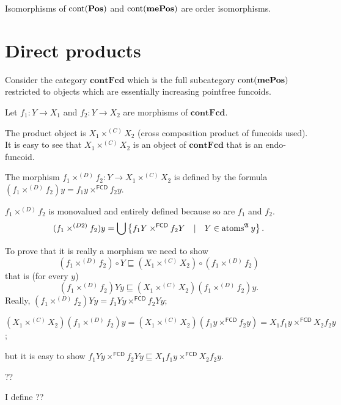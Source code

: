 \begin{obvious}
Isomorphisms of $\operatorname{cont} (\mathbf{Pos})$ and
$\operatorname{cont} (\mathbf{mePos})$ are order
isomorphisms.
\end{obvious}

\section{Direct products}


Consider the category $\mathbf{contFcd}$ which is the full
subcategory $\operatorname{cont} (\mathbf{mePos})$ restricted to
objects which are essentially increasing pointfree funcoids.

Let $f_1 : Y \rightarrow X_1$ and $f_2 : Y \rightarrow X_2$ are morphisms of
$\mathbf{contFcd}$.

The product object is $X_1 \times^{(C)} X_2$ (cross composition product of
funcoids used). It is easy to see that $X_1 \times^{(C)} X_2$ is an object of
$\mathbf{contFcd}$ that is an endo-funcoid.

The morphism $f_1 \times^{(D)} f_2 : Y \rightarrow X_1 \times^{(C)} X_2$ is
defined by the formula $(f_1 \times^{(D)} f_2) y = f_1 y
\times^{\mathsf{FCD}} f_2 y$.

$f_1 \times^{(D)} f_2$ is monovalued and entirely defined because so are $f_1$
and $f_2$.
\[ (f_1 \times^{(D 2)} f_2) y = \bigcup \left\{ f_1 Y
   \times^{\mathsf{FCD}} f_2 Y \hspace{1em} | \hspace{1em} Y \in
   \operatorname{atoms}^{\mathfrak{A}} y \right\} . \]


To prove that it is really a morphism we need to show
\[ (f_1 \times^{(D)} f_2) \circ Y \sqsubseteq (X_1 \times^{(C)} X_2) \circ
   (f_1 \times^{(D)} f_2) \]
that is (for every $y$)
\[ (f_1 \times^{(D)} f_2) Y y \sqsubseteq (X_1 \times^{(C)} X_2) (f_1
   \times^{(D)} f_2) y. \]
Really, $(f_1 \times^{(D)} f_2) Y y = f_1 Y y \times^{\mathsf{FCD}} f_2
Y y$;

$(X_1 \times^{(C)} X_2) (f_1 \times^{(D)} f_2) y = (X_1 \times^{(C)} X_2) (f_1
y \times^{\mathsf{FCD}} f_2 y) = X_1 f_1 y \times^{\mathsf{FCD}}
X_2 f_2 y$;

but it is easy to show $f_1 Y y \times^{\mathsf{FCD}} f_2 Y y
\sqsubseteq X_1 f_1 y \times^{\mathsf{FCD}} X_2 f_2 y$.

??

I define ??

